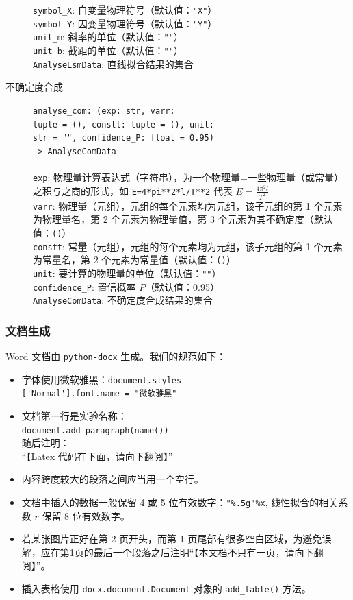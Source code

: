 \begin{description}
  \verb|symbol_X|: 自变量物理符号（默认值：\verb|"X"|）\\
  \verb|symbol_Y|: 因变量物理符号（默认值：\verb|"Y"|）\\
  \verb|unit_m|: 斜率的单位（默认值：\verb|""|）\\
  \verb|unit_b|: 截距的单位（默认值：\verb|""|）\\
  \verb|AnalyseLsmData|: 直线拟合结果的集合
  \item[不确定度合成] \verb|analyse_com: (exp: str, varr:|\\\verb|tuple = (), constt: tuple = (), unit:|\\\verb|str = "", confidence_P: float = 0.95)|\\\verb|-> AnalyseComData|\\
  \\
  \verb|exp|: 物理量计算表达式（字符串），为一个物理量=一些物理量（或常量）之积与之商的形式，如 \verb|E=4*pi**2*l/T**2| 代表 \(E=\frac{4\pi^2l}{T^2}\)\\
  \verb|varr|: 物理量（元组），元组的每个元素均为元组，该子元组的第 1 个元素为物理量名，第 2 个元素为物理量值，第 3 个元素为其不确定度（默认值：\verb|()|）\\
  \verb|constt|: 常量（元组），元组的每个元素均为元组，该子元组的第 1 个元素为常量名，第 2 个元素为常量值（默认值：\verb|()|）\\
  \verb|unit|: 要计算的物理量的单位（默认值：\verb|""|）\\
  \verb|confidence_P|: 置信概率 \(P\)（默认值：0.95）\\
  \verb|AnalyseComData|: 不确定度合成结果的集合
\end{description}

\subsubsection{文档生成}

Word 文档由 \verb|python-docx| 生成。我们的规范如下：
\begin{itemize}
  \item 字体使用微软雅黑：\verb|document.styles|\\\verb|['Normal'].font.name = "微软雅黑"|
  \item 文档第一行是实验名称：\\\verb|document.add_paragraph(name())|\\随后注明：\\“【Latex 代码在下面，请向下翻阅】”
  \item 内容跨度较大的段落之间应当用一个空行。
  \item 文档中插入的数据一般保留 4 或 5 位有效数字：\verb|"%.5g"%x|, 线性拟合的相关系数 \(r\) 保留 8 位有效数字。
  \item 若某张图片正好在第 2 页开头，而第 1 页尾部有很多空白区域，为避免误解，应在第1页的最后一个段落之后注明“【本文档不只有一页，请向下翻阅】”。
  \item 插入表格使用 \verb|docx.document.Document| 对象的 \verb|add_table()| 方法。
\end{itemize}

